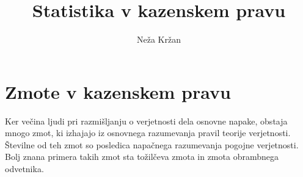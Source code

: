 \documentclass[12pt,a4paper]{amsart}
\theoremstyle{definition} %
\theoremstyle{plain} %
\begin{document}
\title{Statistika v kazenskem pravu}
\author{Neža Kržan}
\maketitle

\section{Zmote v kazenskem pravu}
Ker večina ljudi pri razmišljanju o verjetnosti dela osnovne napake, obstaja mnogo zmot, ki izhajajo iz osnovnega razumevanja pravil
teorije verjetnosti. Številne od teh zmot so posledica napačnega razumevanja pogojne verjetnosti. Bolj znana primera takih zmot sta
tožilčeva zmota in zmota obrambnega odvetnika.

\end{document}
